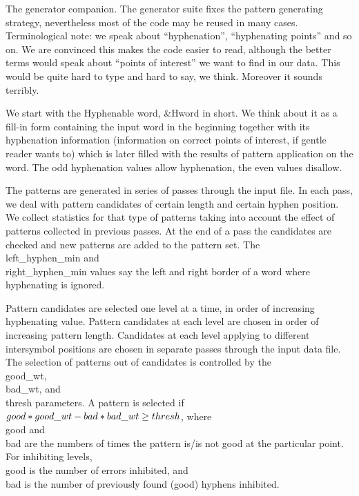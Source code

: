 The generator companion.
The generator suite fixes the pattern generating strategy, nevertheless
most of the code may be reused in many cases. Terminological note: we speak
about ``hyphenation'', ``hyphenating points'' and so on. We are convinced
this makes the code easier to read, although the better terms would speak
about ``points of interest'' we want to find in our data. This would be
quite hard to type and hard to say, we think. Moreover it sounds terribly.

\fi

We start with the Hyphenable word, \&{Hword} in short. We think about it
as
a fill-in form containing the input word in the beginning together with its
hyphenation information (information on correct points of interest, if
gentle reader wants to) which is later filled with the results of pattern
application on the word. The odd hyphenation values allow hyphenation, the
even values disallow.

\fi

The patterns are generated in series of passes through the input file. In
each pass, we deal with pattern candidates of certain length and certain
hyphen position. We collect statistics for that type of patterns taking
into account the effect of patterns collected in previous passes. At the
end of a pass the candidates are checked and new patterns are added to the
pattern set.
The \\{left\_hyphen\_min} and \\{right\_hyphen\_min} values say the left and
right
border of a word where hyphenating is ignored.

Pattern candidates are selected one level at a time, in order of increasing
hyphenating value. Pattern candidates at each level are chosen in order of
increasing pattern length. Candidates at each level applying to different
intersymbol positions are chosen in separate passes through the input data
file. The selection of patterns out of candidates is controlled by the
\\{good\_wt}, \\{bad\_wt}, and \\{thresh} parameters. A pattern is selected if
$\\{good}*\\{good\_wt}-\\{bad}*\\{bad\_wt}\ge\\{thresh}$, where \\{good} and %
\\{bad} are the
numbers of times the pattern is/is not good at the particular point. For
inhibiting levels, \\{good} is the number of errors inhibited, and \\{bad}
is the number of previously found (good) hyphens inhibited.

